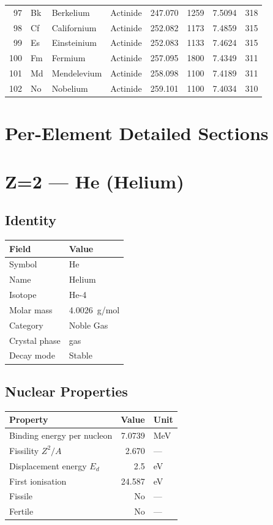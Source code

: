 \documentclass[11pt,a4paper]{article}
\begin{document}
\begin{longtable}{rlllrrrr}
  97 & Bk & Berkelium & Actinide & 247.070 & 1259 & 7.5094 & 318 \\
  98 & Cf & Californium & Actinide & 252.082 & 1173 & 7.4859 & 315 \\
  99 & Es & Einsteinium & Actinide & 252.083 & 1133 & 7.4624 & 315 \\
  100 & Fm & Fermium & Actinide & 257.095 & 1800 & 7.4349 & 311 \\
  101 & Md & Mendelevium & Actinide & 258.098 & 1100 & 7.4189 & 311 \\
  102 & No & Nobelium & Actinide & 259.101 & 1100 & 7.4034 & 310 \\
  \bottomrule
\end{longtable}

\newpage

\section{Per-Element Detailed Sections}

\newpage

\section{Z=2 --- He (Helium)}
\label{sec:Z2}

\subsection{Identity}
\begin{tabular}{ll}
  \toprule
  Field & Value \\
  \midrule
  Symbol & He \\
  Name & Helium \\
  Isotope & He-4 \\
  Molar mass & \SI{4.0026}{g/mol} \\
  Category & Noble Gas \\
  Crystal phase & gas \\
  Decay mode & Stable \\
  \bottomrule
\end{tabular}

\subsection{Nuclear Properties}
\begin{tabular}{lrl}
  \toprule
  Property & Value & Unit \\
  \midrule
  Binding energy per nucleon & 7.0739 & \si{MeV} \\
  Fissility $Z^2/A$ & 2.670 & --- \\
  Displacement energy $E_d$ & 2.5 & \si{eV} \\
  First ionisation & 24.587 & \si{eV} \\
  Fissile & No & --- \\
  Fertile & No & --- \\
  \bottomrule
\end{tabular}
\end{document}
